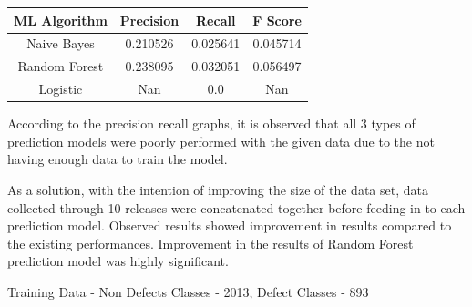 \documentclass{seal_article}
\begin{document}
\begin{center}
 \begin{tabular}{||c c c c||} 
 \hline
 ML Algorithm &Precision & Recall & F Score   \\ [0.5ex] 
 \hline\hline
  Naive Bayes &0.210526&0.025641& 0.045714\\ 
 \hline
 Random Forest & 0.238095 & 0.032051 & 0.056497 \\
 \hline
 Logistic & Nan & 0.0 & Nan \\
 \hline

\end{tabular}

\end{center}

According to the precision recall graphs, it is observed that all 3 types of prediction models were poorly performed with the given data due to the not having enough data to train the model. 

As a solution, with the intention of improving the size of the data set, data collected through 10 releases were concatenated together before feeding in to each prediction model. Observed results showed improvement in results compared to the existing performances. Improvement in the results of Random Forest prediction model was highly significant. 

\vspace{0.5cm}
Training Data - 
Non Defects Classes - 2013, Defect Classes - 893
\end{document}
